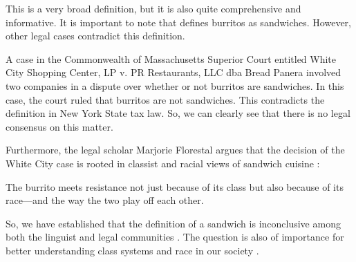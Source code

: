 This is a very broad definition, but it is also quite comprehensive and informative.
It is important to note that \cite{taxDefinition} defines burritos as sandwiches.
However, other legal cases contradict this definition.

A case in the Commonwealth of Massachusetts Superior Court entitled White City Shopping Center, LP v. PR Restaurants, LLC dba Bread Panera \cite{whiteCityCase} involved two companies in a dispute over whether or not burritos are sandwiches.
In this case, the court ruled that burritos are not sandwiches.
This contradicts the definition in New York State tax law.
So, we can clearly see that there is no legal consensus on this matter.

Furthermore, the legal scholar Marjorie Florestal argues that the decision of the White City case is rooted in classist and racial views of sandwich cuisine \cite{classPaper}:
\begin{displayquote}
	The burrito meets resistance not just because of its class but also because of its race---and the way the two play off each other.
\end{displayquote}

So, we have established that the definition of a sandwich is inconclusive among both the linguist and legal communities \cite{oxfordDefinition, freeDefinition, taxDefinition, whiteCityCase}.
The question is also of importance for better understanding class systems and race in our society \cite{classPaper}.

